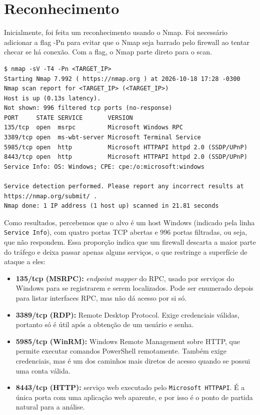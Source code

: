 \documentclass[12pt]{article}
\begin{document}
\section{Reconhecimento}

Inicialmente, foi feita um reconhecimento usando o Nmap. Foi necessário adicionar a flag -Pn para evitar que o Nmap seja barrado pelo firewall ao tentar checar se há conexão. Com a flag, o Nmap parte direto para o scan.

\begin{lstlisting}[caption={Varredura de portas com Nmap}, label={lst:nmap}]
$ nmap -sV -T4 -Pn <TARGET_IP>
Starting Nmap 7.992 ( https://nmap.org ) at 2026-10-18 17:28 -0300
Nmap scan report for <TARGET_IP> (<TARGET_IP>)
Host is up (0.13s latency).
Not shown: 996 filtered tcp ports (no-response)
PORT     STATE SERVICE       VERSION
135/tcp  open  msrpc         Microsoft Windows RPC
3389/tcp open  ms-wbt-server Microsoft Terminal Service
5985/tcp open  http          Microsoft HTTPAPI httpd 2.0 (SSDP/UPnP)
8443/tcp open  http          Microsoft HTTPAPI httpd 2.0 (SSDP/UPnP)
Service Info: OS: Windows; CPE: cpe:/o:microsoft:windows

Service detection performed. Please report any incorrect results at https://nmap.org/submit/ .
Nmap done: 1 IP address (1 host up) scanned in 21.81 seconds
\end{lstlisting}

Como resultados, percebemos que o alvo é um host Windows (indicado pela linha \texttt{Service Info}), com quatro portas TCP abertas e 996 portas filtradas, ou seja, que não respondem. Essa proporção indica que um firewall descarta a maior parte do tráfego e deixa passar apenas alguns serviços, o que restringe a superfície de ataque a eles:

\begin{itemize}
    \item \textbf{135/tcp (MSRPC):} \textit{endpoint mapper} do RPC, usado por serviços do Windows para se registrarem e serem localizados. Pode ser enumerado depois para listar interfaces RPC, mas não dá acesso por si só.
    \item \textbf{3389/tcp (RDP):} Remote Desktop Protocol. Exige credenciais válidas, portanto só é útil após a obtenção de um usuário e senha.
    \item \textbf{5985/tcp (WinRM):} Windows Remote Management sobre HTTP, que permite executar comandos PowerShell remotamente. Também exige credenciais, mas é um dos caminhos mais diretos de acesso quando se possui uma conta válida.
    \item \textbf{8443/tcp (HTTP):} serviço web executado pelo \texttt{Microsoft HTTPAPI}. É a única porta com uma aplicação web aparente, e por isso é o ponto de partida natural para a análise.
\end{itemize}
\end{document}
